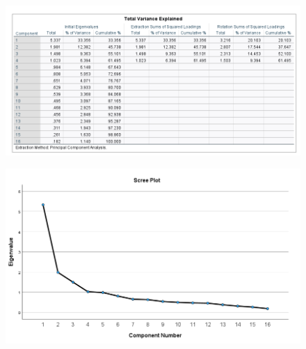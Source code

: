 \documentclass[english,10pt,a4paper]{article}
\begin{document}



\begin{figure}
	
	\includegraphics[width=1\linewidth]{total varience explained.png}

	
\end{figure}

\begin{figure}
		\includegraphics[width=1\linewidth]{scree plot.png}
\end{figure}

\end{document}
